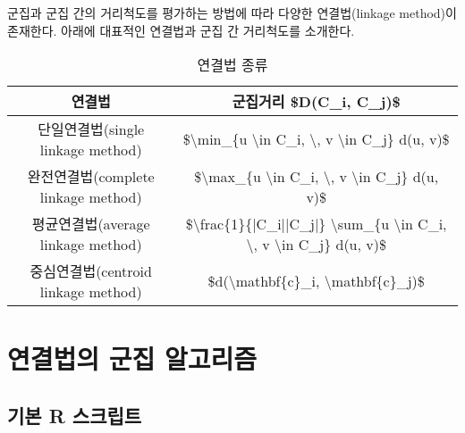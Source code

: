 \documentclass[
]{book}
\begin{document}
군집과 군집 간의 거리척도를 평가하는 방법에 따라 다양한 연결법(linkage method)이 존재한다. 아래에 대표적인 연결법과 군집 간 거리척도를 소개한다.

\begin{table}

\caption{\label{tab:linkage-method}연결법 종류}
\centering
\begin{tabular}[t]{cc}
\toprule
연결법 & 군집거리 \$D(C\_i, C\_j)\$\\
\midrule
단일연결법(single linkage method) & \$\textbackslash{}min\_\{u \textbackslash{}in C\_i, \textbackslash{}, v \textbackslash{}in C\_j\} d(u, v)\$\\
완전연결법(complete linkage method) & \$\textbackslash{}max\_\{u \textbackslash{}in C\_i, \textbackslash{}, v \textbackslash{}in C\_j\} d(u, v)\$\\
평균연결법(average linkage method) & \$\textbackslash{}frac\{1\}\{|C\_i||C\_j|\} \textbackslash{}sum\_\{u \textbackslash{}in C\_i, \textbackslash{}, v \textbackslash{}in C\_j\} d(u, v)\$\\
중심연결법(centroid linkage method) & \$d(\textbackslash{}mathbf\{c\}\_i, \textbackslash{}mathbf\{c\}\_j)\$\\
\bottomrule
\end{tabular}
\end{table}

\hypertarget{linkage-method}{%
\section{연결법의 군집 알고리즘}\label{linkage-method}}

\hypertarget{linkage-method-basic-script}{%
\subsection{기본 R 스크립트}\label{linkage-method-basic-script}}
\end{document}
